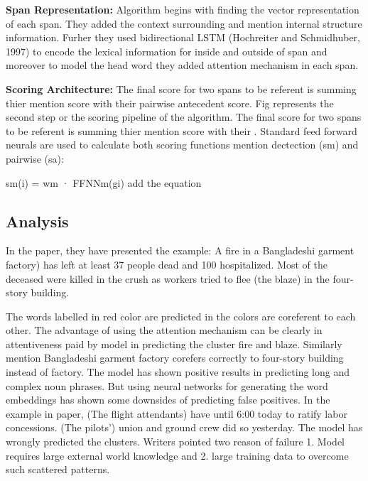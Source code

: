 \documentclass[11pt]{article}
\begin{document}
\textbf{Span Representation: }Algorithm begins with finding the vector representation of each span. They added the context surrounding and mention internal structure information. Furher they used  bidirectional LSTM (Hochreiter and Schmidhuber, 1997) to  encode the lexical information for  inside and outside of span and moreover to model the head word they added attention mechanism in each span.


\textbf{Scoring Architecture: }The final score for two spans to be referent is summing thier mention score with their pairwise antecedent score.  Fig represents the second step or the scoring pipeline of the algorithm. The final score for two spans to be referent is summing thier mention score with their 
. Standard feed forward neurals are used to calculate both scoring  functions mention dectection (sm) and pairwise (sa):
 


sm(i) = wm · FFNNm(gi)
add the equation



\subsection{Analysis}
In the paper, they have presented the example:
A fire in a Bangladeshi garment factory) has left at least 37 people dead and 100 hospitalized. Most
of the deceased were killed in the crush as workers tried to flee (the blaze) in the four-story building.

The words labelled in red color are predicted in the colors are coreferent to each other. The advantage of using the attention mechanism can be clearly in attentiveness paid by model in predicting the cluster fire and blaze. Similarly mention Bangladeshi garment factory corefers correctly to four-story building instead of factory. The model has shown positive results in predicting long and complex noun phrases. But using neural networks for generating the word embeddings has shown some downsides of predicting false positives. In the example in paper, (The flight attendants) have until 6:00 today to ratify labor concessions. (The pilots’) union and ground crew did so yesterday. The model has wrongly predicted the clusters. Writers pointed two reason of failure 1. Model requires large external world knowledge and 2. large training data to overcome such scattered patterns.
\end{document}
